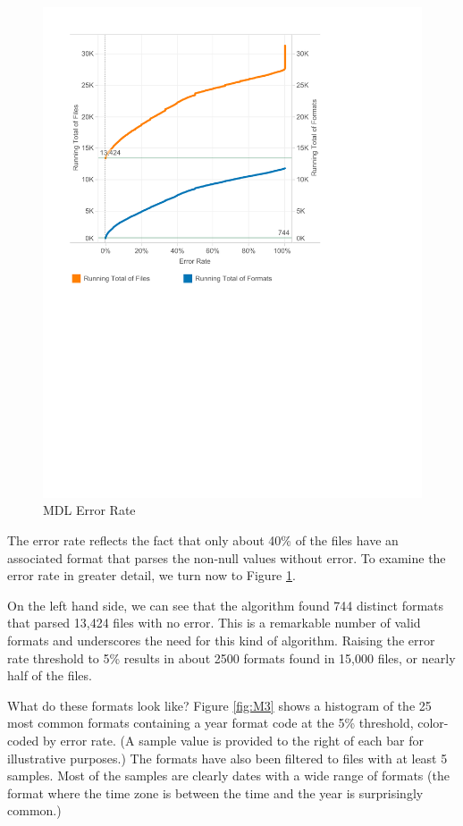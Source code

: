 \begin{figure}[ht]
\centering
\includegraphics[width=\columnwidth]{figures/FigureM2}
\caption{MDL Error Rate}
\label{fig:M2}
\end{figure}

The error rate reflects the fact that only about 40\% of the files have an associated format that parses the non-null values without error. To examine the error rate in greater detail, we turn now to Figure \ref{fig:M2}.

On the left hand side, we can see that the algorithm found 744 distinct formats that parsed 13,424 files with no error. This is a remarkable number of valid formats and underscores the need for this kind of algorithm. Raising the error rate threshold to 5\% results in about 2500 formats found in 15,000 files, or nearly half of the files. 

What do these formats look like? Figure \ref{fig:M3} shows a histogram of the 25 most common formats containing a year format code at the 5\% threshold, color-coded by error rate. (A sample value is provided to the right of each bar for illustrative purposes.) The formats have also been filtered to files with at least 5 samples. Most of the samples are clearly dates with a wide range of formats (the format where the time zone is between the time and the year is surprisingly common.)
 
